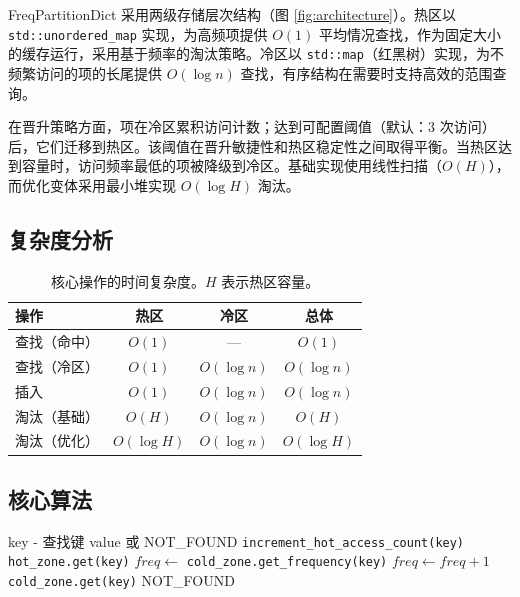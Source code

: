 \documentclass[11pt,a4paper]{article}
\begin{document}
FreqPartitionDict 采用两级存储层次结构（图 \ref{fig:architecture}）。热区以 \texttt{std::unordered\_map} 实现，为高频项提供 $O(1)$ 平均情况查找，作为固定大小的缓存运行，采用基于频率的淘汰策略。冷区以 \texttt{std::map}（红黑树）实现，为不频繁访问的项的长尾提供 $O(\log n)$ 查找，有序结构在需要时支持高效的范围查询。

在晋升策略方面，项在冷区累积访问计数；达到可配置阈值（默认：3 次访问）后，它们迁移到热区。该阈值在晋升敏捷性和热区稳定性之间取得平衡。当热区达到容量时，访问频率最低的项被降级到冷区。基础实现使用线性扫描（$O(H)$），而优化变体采用最小堆实现 $O(\log H)$ 淘汰。

\subsection{复杂度分析}

\begin{table}[H]
\centering
\caption{核心操作的时间复杂度。$H$ 表示热区容量。}
\label{tab:complexity}
\begin{tabular}{lccc}
\toprule
\textbf{操作} & \textbf{热区} & \textbf{冷区} & \textbf{总体} \\
\midrule
查找（命中） & $O(1)$ & — & $O(1)$ \\
查找（冷区） & $O(1)$ & $O(\log n)$ & $O(\log n)$ \\
插入 & $O(1)$ & $O(\log n)$ & $O(\log n)$ \\
淘汰（基础） & $O(H)$ & $O(\log n)$ & $O(H)$ \\
淘汰（优化） & $O(\log H)$ & $O(\log n)$ & $O(\log H)$ \\
\bottomrule
\end{tabular}
\end{table}

\subsection{核心算法}

\begin{algorithm}[H]
\caption{查找操作}
\label{alg:lookup}
\begin{algorithmic}[1]
\Require key - 查找键
\Ensure value 或 NOT\_FOUND
    \State \texttt{increment\_hot\_access\_count(key)}
    \State \Return \texttt{hot\_zone.get(key)}
    \State $freq \gets$ \texttt{cold\_zone.get\_frequency(key)}
    \State $freq \gets freq + 1$
        \State {}
    \EndIf
    \State \Return \texttt{cold\_zone.get(key)}
\EndIf
\State \Return NOT\_FOUND
\end{algorithmic}
\end{algorithm}
\end{document}
